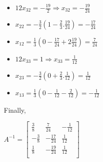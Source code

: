 \documentclass[12pt]{article}
\newenvironment{exercise}[2][Exercise]{\begin{trivlist}
\item[\hskip \labelsep {\bfseries #1}\hskip \labelsep {\bfseries #2.}]}{\end{trivlist}}
\begin{document}
\begin{exercise}{6}
\begin{itemize}
\item $12x_{32} = -\frac{19}{2} \Rightarrow x_{32} = -\frac{19}{24}$
\item $x_{22} = -\frac{3}{2}(1-\frac{2}{3}.\frac{19}{24}) = -\frac{17}{24}$
\item $x_{12} = \frac{1}{3}(0-\frac{17}{24}+2\frac{19}{24}) = \frac{7}{24}$
\end{itemize}

\begin{itemize}
\item $12x_{33} = 1 \Rightarrow x_{33} = \frac{1}{12}$
\item $x_{23} = -\frac{3}{2}(0+\frac{2}{3}.\frac{1}{12}) = \frac{1}{12}$
\item $x_{13} = \frac{1}{3}(0-\frac{1}{12}-\frac{2}{12}) = -\frac{1}{12}$
\end{itemize}

Finally,
\begin{center}
$A^{-1} = \begin{bmatrix}
\frac{3}{8}&\frac{7}{24}&-\frac{1}{12}\\
-\frac{3}{8}&-\frac{17}{24}&\frac{1}{12}\\
\frac{1}{8}&-\frac{19}{24}&\frac{1}{12}\\
\end{bmatrix}
$
\end{center}
\end{exercise}
\end{document}
